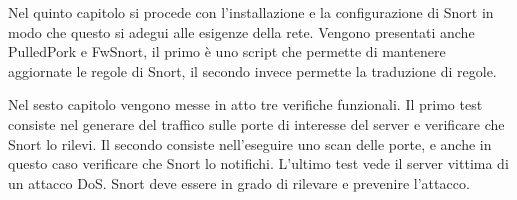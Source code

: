 Nel quinto capitolo si procede con l'installazione e la configurazione di Snort in modo che questo si adegui alle esigenze della rete. Vengono presentati anche PulledPork e FwSnort, il primo è uno script che permette di mantenere aggiornate le regole di Snort, il secondo invece permette la traduzione di regole.

Nel sesto capitolo vengono messe in atto tre verifiche funzionali. Il primo test consiste nel generare del traffico sulle porte di interesse del server e verificare che Snort lo rilevi. Il secondo consiste nell'eseguire uno scan delle porte, e anche in questo caso verificare che Snort lo notifichi. L'ultimo test vede il server vittima di un attacco DoS. Snort deve essere in grado di rilevare e prevenire l'attacco.